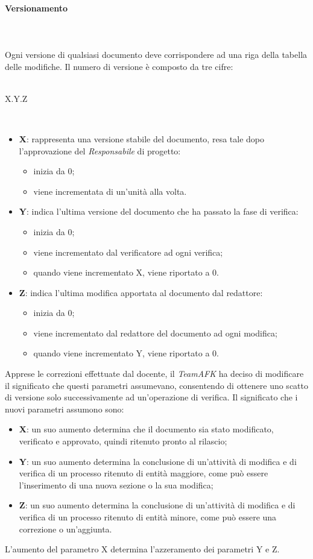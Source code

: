 \paragraph{Versionamento}\mbox{} \\ \mbox{} \\
Ogni versione di qualsiasi documento deve corrispondere ad una riga della tabella delle modifiche. Il numero di versione è composto da tre cifre: \\ \\
\centerline{X.Y.Z} \\
\begin{itemize}
\item \textbf{X}: rappresenta una versione stabile del documento, resa tale dopo l'approvazione del \textit{Responsabile} di progetto: \begin{itemize}
\item inizia da 0; 
\item viene incrementata di un'unità alla volta.
\end{itemize}
\item \textbf{Y}: indica l'ultima versione del documento che ha passato la fase di verifica: \begin{itemize}
\item inizia da 0;
\item viene incrementato dal verificatore ad ogni verifica;
\item quando viene incrementato X, viene riportato a 0.
\end{itemize} 
\item \textbf{Z}: indica l'ultima modifica apportata al documento dal redattore: \begin{itemize}
\item inizia da 0;
\item viene incrementato dal redattore del documento ad ogni modifica;
\item quando viene incrementato Y, viene riportato a 0.
\end{itemize}
\end{itemize}
Apprese le correzioni effettuate dal docente, il \textit{TeamAFK} ha deciso di modificare il significato che questi parametri assumevano, consentendo di ottenere uno scatto di versione solo successivamente ad un'operazione di verifica. Il significato che i nuovi parametri assumono sono:
\begin{itemize}
    \item \textbf{X}: un suo aumento determina che il documento sia stato modificato, verificato e approvato, quindi ritenuto pronto al rilascio;
    \item \textbf{Y}: un suo aumento determina la conclusione di un'attività di modifica e di verifica di un processo ritenuto di entità maggiore, come può essere l'inserimento di una nuova sezione o la sua modifica;
    \item \textbf{Z}: un suo aumento determina la conclusione di un'attività di modifica e di verifica di un processo ritenuto di entità minore, come può essere una correzione o un'aggiunta.
\end{itemize}
L'aumento del parametro X determina l'azzeramento dei parametri Y e Z.



